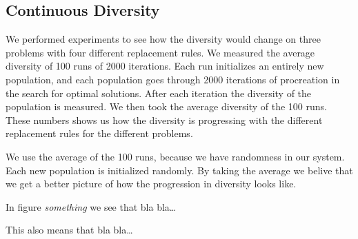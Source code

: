 \subsection{Continuous Diversity}
\label{sec:continuousdiversity}

We performed experiments to see how the diversity would change on three problems with four different replacement rules. We measured the average diversity of \num{100} runs of \num{2000} iterations. Each run initializes an entirely new population, and each population goes through \num{2000} iterations of procreation in the search for optimal solutions. After each iteration the diversity of the population is measured. We then took the average diversity of the \num{100} runs. These numbers shows us how the diversity is progressing with the different replacement rules for the different problems.

We use the average of the \num{100} runs, because we have randomness in our system. Each new population is initialized randomly. By taking the average we belive that we get a better picture of how the progression in diversity looks like.

In figure \emph{something} we see that bla bla\dots

This also means that bla bla\dots


